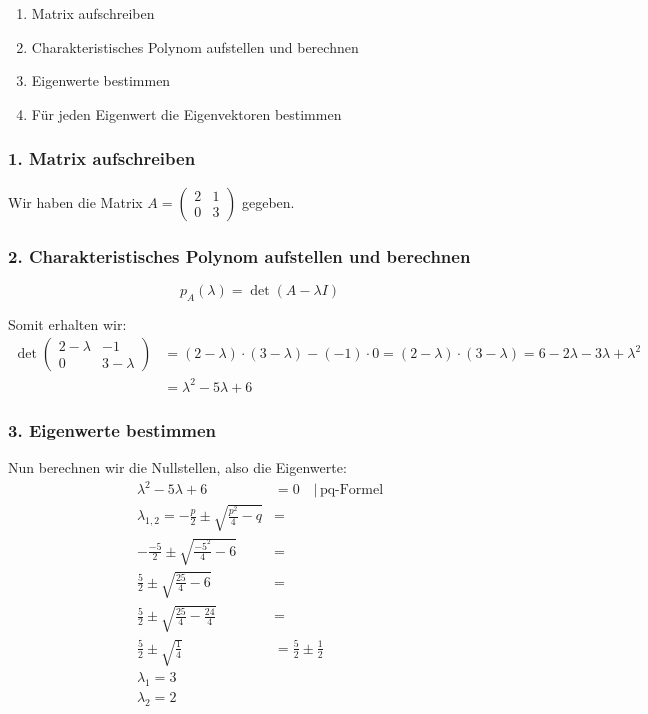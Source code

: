 \documentclass[a4paper,11pt,oneside,open=any,parskip=half, DIV=15]{scrreprt}
\begin{document}
      \begin{enumerate}
         \item Matrix aufschreiben
         \item Charakteristisches Polynom aufstellen und berechnen
         \item Eigenwerte bestimmen
         \item Für jeden Eigenwert die Eigenvektoren bestimmen
      \end{enumerate}

      \subsubsection*{1. Matrix aufschreiben}

         Wir haben die Matrix \( A = \begin{pmatrix} 2 & 1\\ 0 & 3 \end{pmatrix} \) gegeben.

   \subsubsection*{2. Charakteristisches Polynom aufstellen und berechnen}

      \begin{importantbox}
         \[
            p_A(\lambda) = \det(A- \lambda I) 
         \]
      \end{importantbox}

      Somit erhalten wir: \begin{align*}
      \det \begin{pmatrix} 2 - \lambda & -1\\ 0 & 3 - \lambda \end{pmatrix} &= (2 - \lambda) \cdot (3 - \lambda) - (-1) \cdot 0 = (2 - \lambda) \cdot (3 - \lambda) = 6 - 2\lambda -3\lambda + {\lambda}^2\\ &=  {\lambda}^2 - 5\lambda + 6
      \end{align*}

   \subsubsection*{3. Eigenwerte bestimmen}

      Nun berechnen wir die Nullstellen, also die Eigenwerte: 
      \begin{align*}
         {\lambda}^2 - 5\lambda + 6 &= 0 \quad \vert \, \text{pq-Formel}\\
         {\lambda}_{1,2} = - \frac{p}{2} \pm \sqrt{\frac{{p}^2}{4}-q} &=\\ 
         - \frac{-5}{2} \pm \sqrt{\frac{{-5}^2}{4}-6} &=\\ 
         \frac{5}{2} \pm \sqrt{\frac{25}{4}-6} &=\\ 
         \frac{5}{2} \pm \sqrt{\frac{25}{4}-\frac{24}{4}} &=\\
         \frac{5}{2} \pm \sqrt{\frac{1}{4}} &= \frac{5}{2} \pm \frac{1}{2} \\
         \lambda_1 = 3\\
         \lambda_2 = 2
      \end{align*}
\end{document}
